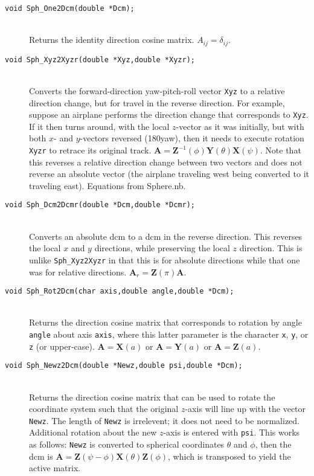 \documentclass[11pt]{article}
\newcommand {\ttt} {\texttt}
\begin{document}
\begin{description}
\item[\ttt{void Sph\_One2Dcm(double *Dcm);}]
\hfill \\
Returns the identity direction cosine matrix. $A_{ij} = \delta_{ij}$.

\item[\ttt{void Sph\_Xyz2Xyzr(double *Xyz,double *Xyzr);}]
\hfill \\
Converts the forward-direction yaw-pitch-roll vector \ttt{Xyz} to a relative direction change, but for travel in the reverse direction. For example, suppose an airplane performs the direction change that corresponds to \ttt{Xyz}. If it then turns around, with the local $z$-vector as it was initially, but with both $x$- and $y$-vectors reversed (180\degree yaw), then it needs to execute rotation \ttt{Xyzr} to retrace its original track. $\bm{A} = \bm{Z}^{-1}(\phi)\bm{Y}(\theta)\bm{X}(\psi)$. Note that this reverses a relative direction change between two vectors and does not reverse an absolute vector (the airplane traveling west being converted to it traveling east). Equations from Sphere.nb.

\item[\ttt{void Sph\_Dcm2Dcmr(double *Dcm,double *Dcmr);}]
\hfill \\
Converts an absolute dcm to a dcm in the reverse direction. This reverses the local $x$ and $y$ directions, while preserving the local $z$ direction. This is unlike \ttt{Sph\_Xyz2Xyzr} in that this is for absolute directions while that one was for relative directions. $\bm{A}_r = \bm{Z}(\pi)\bm{A}$.

\item[\ttt{void Sph\_Rot2Dcm(char axis,double angle,double *Dcm);}]
\hfill \\
Returns the direction cosine matrix that corresponds to rotation by angle \ttt{angle} about axis \ttt{axis}, where this latter parameter is the character \ttt{x}, \ttt{y}, or \ttt{z} (or upper-case). $\bm{A} = \bm{X}(a)$ or $\bm{A} = \bm{Y}(a)$ or $\bm{A} = \bm{Z}(a)$.

\item[\ttt{void Sph\_Newz2Dcm(double *Newz,double psi,double *Dcm);}]
\hfill \\
Returns the direction cosine matrix that can be used to rotate the coordinate system such that the original $z$-axis will line up with the vector \ttt{Newz}. The length of \ttt{Newz} is irrelevent; it does not need to be normalized. Additional rotation about the new $z$-axis is entered with \ttt{psi}. This works as follows: \ttt{Newz} is converted to spherical coordinates $\theta$ and $\phi$, then the dcm is $\bm{A} = \bm{Z}(\psi-\phi) \bm{X}(\theta) \bm{Z}(\phi)$, which is transposed to yield the active matrix.


\end{description}
\end{document}
